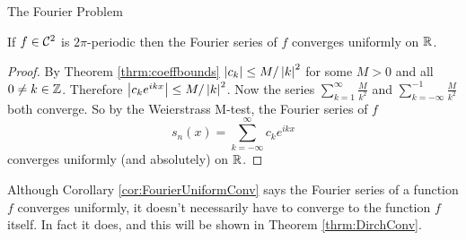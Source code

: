 \begin{section}{The Fourier Problem}
\begin{cor}\label{cor:FourierUniformConv}
	If $f \in \ctsdiff[2]$ is $2\pi$-periodic then the Fourier
	series of $f$ converges uniformly on $\real$.
\end{cor}

\begin{proof}
	By Theorem \ref{thrm:coeffbounds} $\modulus{c_k} \leq
	M/\modulus{k}^2$ for some $M > 0$ and all $0 \neq k
	\in \intgr$. Therefore $\modulus{c_k e^{ikx}} \leq
	M/\modulus{k}^2$. Now the series $\sum_{k=1}
	^\infty \frac{M}{k^2}$ and $\sum_{k=-\infty}^{-1}
	\frac{M}{k^2}$ both converge. So by the Weierstrass
	M-test, the Fourier series of $f$
		\begin{displaymath}
			s_n(x) = \sum_{k=-\infty}^\infty c_k e^{ikx}
		\end{displaymath}
	converges uniformly (and absolutely) on $\real$.
\end{proof}

Although Corollary \ref{cor:FourierUniformConv} says the Fourier series of a function $f$ converges uniformly, it doesn't necessarily have to converge to the function $f$ itself. In fact it does,
and this will be shown in Theorem \ref{thrm:DirchConv}.
\end{section}